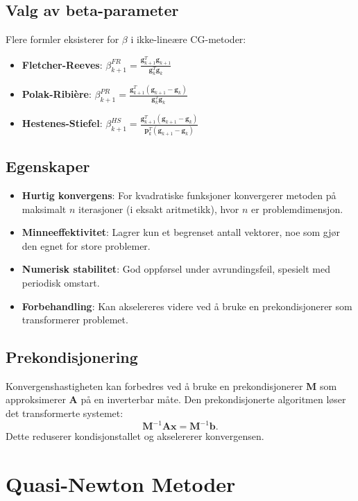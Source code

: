 \subsection{Valg av beta-parameter}

Flere formler eksisterer for \(\beta\) i ikke-lineære CG-metoder:
\begin{itemize}
  \item \textbf{Fletcher-Reeves}: \(\beta_{k+1}^{FR} = \frac{\symbf{g}_{k+1}^T\symbf{g}_{k+1}}{\symbf{g}_k^T\symbf{g}_k}\)
  \item \textbf{Polak-Ribière}: \(\beta_{k+1}^{PR} = \frac{\symbf{g}_{k+1}^T(\symbf{g}_{k+1}-\symbf{g}_k)}{\symbf{g}_k^T\symbf{g}_k}\)
  \item \textbf{Hestenes-Stiefel}: \(\beta_{k+1}^{HS} = \frac{\symbf{g}_{k+1}^T(\symbf{g}_{k+1}-\symbf{g}_k)}{\symbf{p}_k^T(\symbf{g}_{k+1}-\symbf{g}_k)}\)
\end{itemize}

\subsection{Egenskaper}
\begin{itemize}
  \item \textbf{Hurtig konvergens}: For kvadratiske funksjoner konvergerer metoden på maksimalt \(n\) iterasjoner (i eksakt aritmetikk), hvor \(n\) er problemdimensjon.
  \item \textbf{Minneeffektivitet}: Lagrer kun et begrenset antall vektorer, noe som gjør den egnet for store problemer.
  \item \textbf{Numerisk stabilitet}: God oppførsel under avrundingsfeil, spesielt med periodisk omstart.
  \item \textbf{Forbehandling}: Kan akselereres videre ved å bruke en prekondisjonerer som transformerer problemet.
\end{itemize}

\subsection{Prekondisjonering}
Konvergenshastigheten kan forbedres ved å bruke en prekondisjonerer \(\symbf{M}\) som approksimerer \(\symbf{A}\) på en inverterbar måte. Den prekondisjonerte algoritmen løser det transformerte systemet:
\[
  \symbf{M}^{-1}\symbf{A}\symbf{x} = \symbf{M}^{-1}\symbf{b}.
\]
Dette reduserer kondisjonstallet og akselererer konvergensen.

\section{Quasi-Newton Metoder}\label{sec:quasi_newton}

